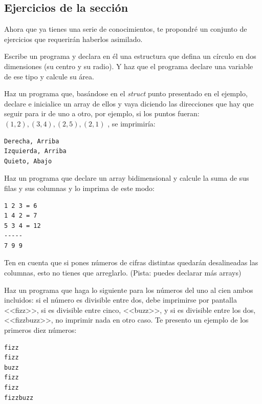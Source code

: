 \documentclass[a4paper]{article}
\begin{document}
\subsection{Ejercicios de la sección}
Ahora que ya tienes una serie de conocimientos, te propondré un conjunto de
ejercicios que requerirán haberlos asimilado.
\begin{exercises}
\item Escribe un programa y declara en él una estructura que defina un círculo
en dos dimensiones (su centro y su radio). Y haz que el programa declare una
variable de ese tipo y calcule su área.
\item Haz un programa que, basándose en el \emph{struct} punto presentado en el
ejemplo, declare e inicialice un array de ellos y vaya diciendo las direcciones
que hay que seguir para ir de uno a otro, por ejemplo, si los puntos fueran:
$(1, 2), (3, 4), (2,5), (2, 1)$ , se imprimiría:



\begin{verbatim}
Derecha, Arriba
Izquierda, Arriba
Quieto, Abajo
\end{verbatim}

\item Haz un programa que declare un array bidimensional y calcule la suma de
sus filas y sus columnas y lo imprima de este modo:



\begin{verbatim}
1 2 3 = 6
1 4 2 = 7
5 3 4 = 12
-----
7 9 9

\end{verbatim}

Ten en cuenta que si pones números de cifras distintas quedarán desalineadas las
columnas, esto no tienes que arreglarlo. (Pista: puedes declarar más arrays)
\item Haz un programa que haga lo siguiente para los números del uno al cien ambos
incluidos: si el número es divisible entre dos, debe imprimirse por pantalla
<<fizz>>, si es divisible entre cinco, <<buzz>>, y si es divisible entre los dos,
<<fizzbuzz>>, no imprimir nada en otro caso.
Te presento un ejemplo de los primeros diez números:



\begin{verbatim}
fizz
fizz
buzz
fizz
fizz
fizzbuzz
\end{verbatim}

\end{exercises}
\end{document}
